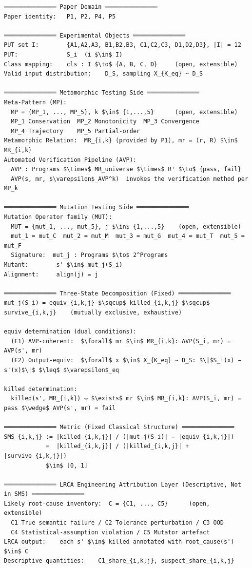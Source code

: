 \documentclass[review,12pt,authoryear]{elsarticle}
\begin{document}
\begin{verbatim}
═══════════════ Paper Domain ═══════════════
Paper identity:   P1, P2, P4, P5

═══════════════ Experimental Objects ═══════════════
PUT set I:        {A1,A2,A3, B1,B2,B3, C1,C2,C3, D1,D2,D3}, |I| = 12
PUT:              S_i  (i $\in$ I)
Class mapping:    cls : I $\to$ {A, B, C, D}     (open, extensible)
Valid input distribution:    D_S, sampling X_{K_eq} ~ D_S

═══════════════ Metamorphic Testing Side ═══════════════
Meta-Pattern (MP):
  MP = {MP_1, ..., MP_5}, k $\in$ {1,...,5}      (open, extensible)
  MP_1 Conservation  MP_2 Monotonicity  MP_3 Convergence
  MP_4 Trajectory    MP_5 Partial-order
Metamorphic Relation:  MR_{i,k} (provided by P1), mr = (r, R) $\in$ MR_{i,k}
Automated Verification Pipeline (AVP):
  AVP : Programs $\times$ MR_universe $\times$ R⁺ $\to$ {pass, fail}
  AVP(s, mr, $\varepsilon$_AVP^k)  invokes the verification method per MP_k

═══════════════ Mutation Testing Side ═══════════════
Mutation Operator family (MUT):
  MUT = {mut_1, ..., mut_5}, j $\in$ {1,...,5}    (open, extensible)
  mut_1 = mut_C  mut_2 = mut_M  mut_3 = mut_G  mut_4 = mut_T  mut_5 = mut_F
  Signature:  mut_j : Programs $\to$ 2^Programs
Mutant:        s' $\in$ mut_j(S_i)
Alignment:     align(j) = j

═══════════════ Three-State Decomposition (Fixed) ═══════════════
mut_j(S_i) = equiv_{i,k,j} $\sqcup$ killed_{i,k,j} $\sqcup$ survive_{i,k,j}    (mutually exclusive, exhaustive)

equiv determination (dual conditions):
  (E1) AVP-coherent:  $\forall$ mr $\in$ MR_{i,k}: AVP(S_i, mr) = AVP(s', mr)
  (E2) Output-equiv:  $\forall$ x $\in$ X_{K_eq} ~ D_S: $\|$S_i(x) − s'(x)$\|$ $\leq$ $\varepsilon$_eq

killed determination:
  killed(s', MR_{i,k}) ⇔ $\exists$ mr $\in$ MR_{i,k}: AVP(S_i, mr) = pass $\wedge$ AVP(s', mr) = fail

═══════════════ Metric (Fixed Classical Structure) ═══════════════
SMS_{i,k,j} := |killed_{i,k,j}| / (|mut_j(S_i)| − |equiv_{i,k,j}|)
            =  |killed_{i,k,j}| / (|killed_{i,k,j}| + |survive_{i,k,j}|)
            $\in$ [0, 1]

═══════════════ LRCA Engineering Attribution Layer (Descriptive, Not in SMS) ═══════════════
Likely root-cause inventory:  C = {C1, ..., C5}      (open, extensible)
  C1 True semantic failure / C2 Tolerance perturbation / C3 OOD
  C4 Statistical-assumption violation / C5 Mutator artefact
LRCA output:    each s' $\in$ killed annotated with root_cause(s') $\in$ C
Descriptive quantities:    C1_share_{i,k,j}, suspect_share_{i,k,j}


\end{verbatim}
\end{document}
